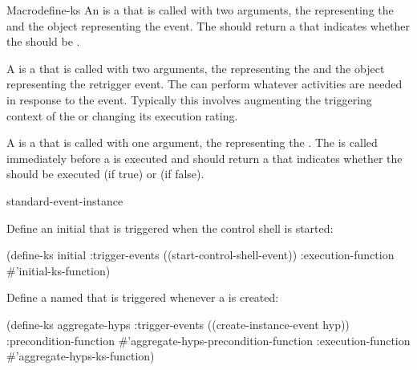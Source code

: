 \documentclass[10pt,twoside,english,pdftex]{article}
\begin{document}
\begin{functiondoc}{Macro}{define-ks}
An  is a  that is called with two
arguments, the  representing the  and the
object representing the  event.  The 
should return a  that indicates whether the
 should be .

A  is a  that is called with
two arguments, the  representing the 
and the object representing the retrigger event.  The
 can perform whatever activities are needed
in response to the event.  Typically this involves augmenting the
triggering context of the  or changing its execution rating.

A  is a  that is called with one
argument, the  representing the .  The
 is called immediately before a  is
executed and should return a  that indicates
whether the  should be executed (if true) or  (if
false).

\begin{alsos}{standard-event-instance}
\also[describe-ks]
\also[ensure-ks]
\also[ks]
\also[ks-enabled-p]
\also[undefine-ks]
\end{alsos}

\fnexamples
Define an initial  that is triggered when the control shell is started:
%
\W\supp
\begin{example}
  (define-ks initial
     :trigger-events ((start-control-shell-event)) 
     :execution-function #'initial-ks-function)
\end{example}

Define a  named  that is triggered whenever a
  is created:
%
\W\supp
\begin{example}
  (define-ks aggregate-hyps
     :trigger-events ((create-instance-event hyp))
     :precondition-function #'aggregate-hyps-precondition-function
     :execution-function #'aggregate-hyps-ks-function)
\end{example}

\fnnote
\instancekstriggersnyi

\end{functiondoc}
\end{document}
